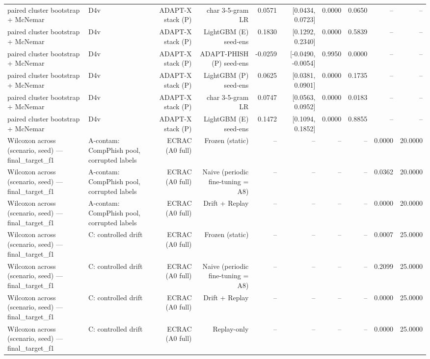 \begin{table}[t]
\begin{tabular}{llrrrrrrrr}
paired cluster bootstrap + McNemar & D4v & ADAPT-X stack (P) & char 3-5-gram LR & 0.0571 & [0.0434, 0.0723] & 0.0000 & 0.0650 & -- & -- \\
paired cluster bootstrap + McNemar & D4v & ADAPT-X stack (P) & LightGBM (E) seed-ens & 0.1830 & [0.1292, 0.2340] & 0.0000 & 0.5839 & -- & -- \\
paired cluster bootstrap + McNemar & D4v & ADAPT-X stack (P) & ADAPT-PHISH (P) seed-ens & -0.0259 & [-0.0490, -0.0054] & 0.9950 & 0.0000 & -- & -- \\
paired cluster bootstrap + McNemar & D4v & ADAPT-X stack (P) & LightGBM (P) seed-ens & 0.0625 & [0.0381, 0.0901] & 0.0000 & 0.1735 & -- & -- \\
paired cluster bootstrap + McNemar & D4v & ADAPT-X stack (P) & char 3-5-gram LR & 0.0747 & [0.0563, 0.0952] & 0.0000 & 0.0183 & -- & -- \\
paired cluster bootstrap + McNemar & D4v & ADAPT-X stack (P) & LightGBM (E) seed-ens & 0.1472 & [0.1094, 0.1852] & 0.0000 & 0.8855 & -- & -- \\
Wilcoxon across (scenario, seed) — final\_target\_f1 & A-contam: CompPhish pool, corrupted labels & ECRAC (A0 full) & Frozen (static) & -- & -- & -- & -- & 0.0000 & 20.0000 \\
Wilcoxon across (scenario, seed) — final\_target\_f1 & A-contam: CompPhish pool, corrupted labels & ECRAC (A0 full) & Naive (periodic fine-tuning = A8) & -- & -- & -- & -- & 0.0362 & 20.0000 \\
Wilcoxon across (scenario, seed) — final\_target\_f1 & A-contam: CompPhish pool, corrupted labels & ECRAC (A0 full) & Drift + Replay & -- & -- & -- & -- & 0.0000 & 20.0000 \\
Wilcoxon across (scenario, seed) — final\_target\_f1 & C: controlled drift & ECRAC (A0 full) & Frozen (static) & -- & -- & -- & -- & 0.0007 & 25.0000 \\
Wilcoxon across (scenario, seed) — final\_target\_f1 & C: controlled drift & ECRAC (A0 full) & Naive (periodic fine-tuning = A8) & -- & -- & -- & -- & 0.2099 & 25.0000 \\
Wilcoxon across (scenario, seed) — final\_target\_f1 & C: controlled drift & ECRAC (A0 full) & Drift + Replay & -- & -- & -- & -- & 0.0000 & 25.0000 \\
Wilcoxon across (scenario, seed) — final\_target\_f1 & C: controlled drift & ECRAC (A0 full) & Replay-only & -- & -- & -- & -- & 0.0000 & 25.0000 \\
\bottomrule
\end{tabular}
\end{table}